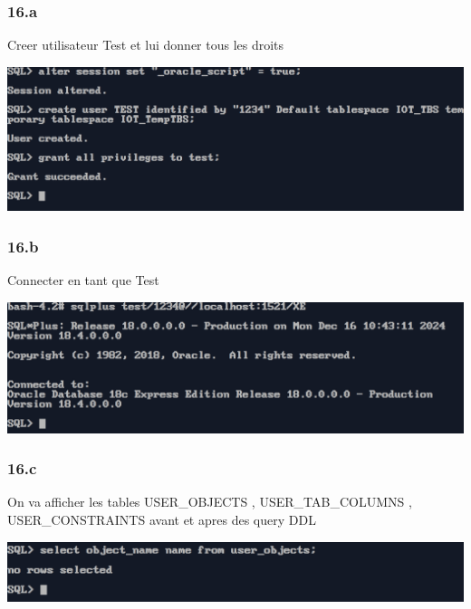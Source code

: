 \subsubsection*{16.a}
Creer utilisateur Test et lui donner tous les droits



\begin{center}
    \includegraphics[width=\textwidth]{ScreenShot/Partie5/create.png}
\end{center}

\subsubsection*{16.b}
Connecter en tant que Test



\begin{center}
    \includegraphics[width=\textwidth]{ScreenShot/Partie5/connecttest.png}
\end{center}

\subsubsection*{16.c}

On va afficher les tables USER\_OBJECTS , USER\_TAB\_COLUMNS , USER\_CONSTRAINTS 
avant et apres des query DDL




\begin{center}
    \includegraphics[width=\textwidth]{ScreenShot/Partie5/testobj1.png}
\end{center}


